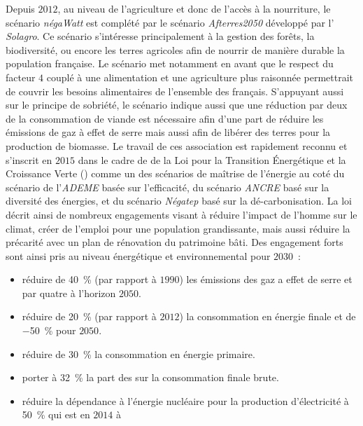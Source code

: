 Depuis $2012$, au niveau de l’agriculture et donc de l’accès à la nourriture, le scénario \textit{négaWatt}
est complété par le scénario \textit{Afterres2050} développé par l’ \textit{Solagro}. Ce
scénario s’intéresse principalement à la gestion des forêts, la biodiversité, ou encore
les terres agricoles afin de nourrir de manière durable la population française.
Le scénario met notamment en avant que le respect du facteur $4$ couplé à une alimentation
et une agriculture plus raisonnée permettrait de couvrir les besoins alimentaires
de l’ensemble des français. S’appuyant aussi sur le principe de sobriété, le scénario
indique aussi que une réduction par deux de la consommation de viande est
nécessaire afin d’une part de réduire les émissions de gaz à effet de serre mais
aussi afin de libérer des terres pour la production de biomasse.
Le travail de ces association est rapidement reconnu et s’inscrit en $2015$ dans le cadre de
de la Loi pour la Transition Énergétique et la Croissance Verte
()
comme un des scénarios de maîtrise de l’énergie au coté du scénario de l’\textit{ADEME}
basée sur l’efficacité, du scénario \textit{ANCRE} basé sur la diversité des énergies, et du scénario \textit{Négatep}
basé sur la dé-carbonisation.
La loi décrit ainsi de nombreux engagements visant à réduire l’impact de l’homme sur le
climat, créer de l’emploi pour une population grandissante, mais aussi réduire la précarité
avec un plan de rénovation du patrimoine bâti. Des engagement forts sont ainsi pris au
niveau énergétique et environnemental pour $2030$~:
\begin{itemize}
    \item réduire de \SI{40}{\percent} (par rapport à $1990$) les émissions des gaz a
          effet de serre et par quatre à l’horizon $2050$.
    \item réduire de \SI{20}{\percent} (par rapport à $2012$) la consommation en énergie
          finale et de \SI{-50}{\percent} pour $2050$.
    \item réduire de \SI{30}{\percent} la consommation en énergie primaire.
    \item porter à \SI{32}{\percent} la part des  sur la consommation finale brute.
    \item réduire la dépendance à l’énergie nucléaire pour la production d’électricité à
          \SI{50}{\percent} qui est en $2014$ à 
\end{itemize}





